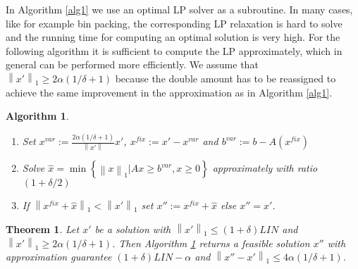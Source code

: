 \documentclass[a4paper,11pt]{article}
\newcommand{\mengest}[2]{\left\{#1|#2\right\}}
\newcommand{\nor}[1]{\left\|#1\right\|}
\newtheorem{thm}{Theorem}
\newtheorem{algo}{Algorithm}
\begin{document}
In Algorithm \ref{alg1} we use an optimal LP solver as a subroutine. In many cases, like for example bin packing,
the corresponding LP relaxation is hard to solve and
the running time
for computing an optimal solution is very high. For the following algorithm it is sufficient to compute the LP
approximately, which in general can be performed more efficiently. We assume that $\nor{x'}_1 \geq 2 \alpha 
(1/ \delta +1)$
because the double amount has to be reassigned to achieve the same improvement in the approximation as in Algorithm \ref{alg1}.
\begin{algo}\label{alg2}
\ 
\begin{enumerate}
\item Set $x^{var} := \frac{2 \alpha(1 / \delta +1)}{\nor{x'}}x'$, $x^{fix} := x' - x^{var}$
  and $b^{var} := b - A(x^{fix})$
\item Solve $\hat{x} = \min \mengest{\nor{x}_1}{Ax \geq b^{var}, x \geq 0 }$
  approximately with ratio $(1+\delta / 2)$
\item If $\nor{x^{fix} + \hat{x}}_1 < \nor{x'}_1$ set $x'' := x^{fix} + \hat{x}$
else $x'' = x'$.
\end{enumerate}
\end{algo}
\begin{thm} \label{thm2}
	Let $x'$ be a solution with $\nor{x'}_1 \leq (1+\delta) \mathit{LIN}$ and $\nor{x'}_1 \geq 2 \alpha(1/ \delta +1)$.
  Then Algorithm \ref{alg2} returns a feasible solution $x''$ with approximation guarantee $(1+ \delta) \mathit{LIN} - \alpha$ 
  and $\nor{x''-x'}_1 \leq 4 \alpha (1/ \delta +1)$.
\end{thm}
\end{document}
